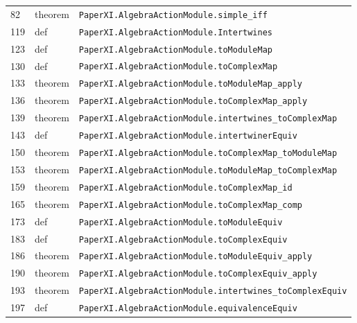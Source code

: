 \documentclass[10pt,oneside]{book}
\begin{document}
\begin{longtable}{@{}p{}p{}p{}@{}}
82&theorem&\nolinkurl{PaperXI.AlgebraActionModule.simple_iff}\\

119&def&\nolinkurl{PaperXI.AlgebraActionModule.Intertwines}\\

123&def&\nolinkurl{PaperXI.AlgebraActionModule.toModuleMap}\\

130&def&\nolinkurl{PaperXI.AlgebraActionModule.toComplexMap}\\

133&theorem&\nolinkurl{PaperXI.AlgebraActionModule.toModuleMap_apply}\\

136&theorem&\nolinkurl{PaperXI.AlgebraActionModule.toComplexMap_apply}\\

139&theorem&\nolinkurl{PaperXI.AlgebraActionModule.intertwines_toComplexMap}\\

143&def&\nolinkurl{PaperXI.AlgebraActionModule.intertwinerEquiv}\\

150&theorem&\nolinkurl{PaperXI.AlgebraActionModule.toComplexMap_toModuleMap}\\

153&theorem&\nolinkurl{PaperXI.AlgebraActionModule.toModuleMap_toComplexMap}\\

159&theorem&\nolinkurl{PaperXI.AlgebraActionModule.toComplexMap_id}\\

165&theorem&\nolinkurl{PaperXI.AlgebraActionModule.toComplexMap_comp}\\

173&def&\nolinkurl{PaperXI.AlgebraActionModule.toModuleEquiv}\\

183&def&\nolinkurl{PaperXI.AlgebraActionModule.toComplexEquiv}\\

186&theorem&\nolinkurl{PaperXI.AlgebraActionModule.toModuleEquiv_apply}\\

190&theorem&\nolinkurl{PaperXI.AlgebraActionModule.toComplexEquiv_apply}\\

193&theorem&\nolinkurl{PaperXI.AlgebraActionModule.intertwines_toComplexEquiv}\\

197&def&\nolinkurl{PaperXI.AlgebraActionModule.equivalenceEquiv}\\


\end{longtable}
\end{document}
